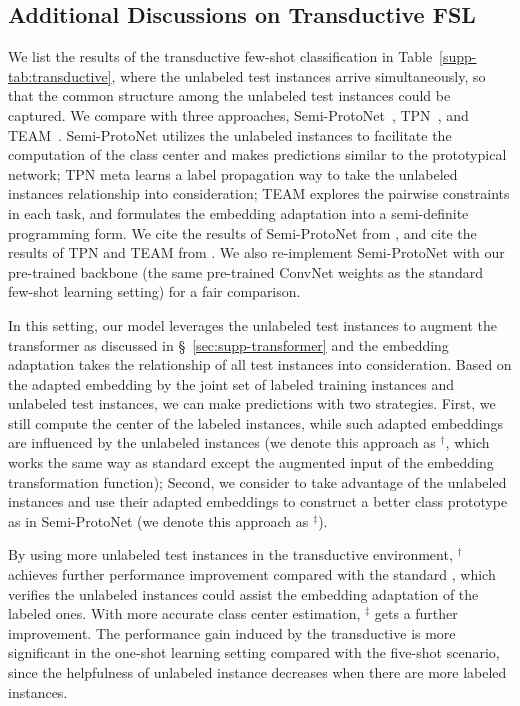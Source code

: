 \subsection{Additional Discussions on Transductive FSL}
\label{sec:supp-extended}
We list the results of the transductive few-shot classification in Table~\ref{supp-tab:transductive}, where the unlabeled test instances arrive simultaneously, so that the common structure among the unlabeled test instances could be captured.
We compare with three approaches, Semi-ProtoNet~\cite{Ren2018Meta}, TPN~\cite{Liu2018TPN}, and TEAM~\cite{Qiao2019Transductive}. Semi-ProtoNet utilizes the unlabeled instances to facilitate the computation of the class center and makes predictions similar to the prototypical network; TPN meta learns a label propagation way to take the unlabeled instances relationship into consideration; TEAM explores the pairwise constraints in each task, and formulates the embedding adaptation into a semi-definite programming form. We cite the results of Semi-ProtoNet from \cite{Ren2018Meta}, and cite the results of TPN and TEAM from \cite{Qiao2019Transductive}. We also re-implement  Semi-ProtoNet with our pre-trained backbone (the same pre-trained ConvNet weights as the standard few-shot learning setting) for a fair comparison.

In this setting, our model leverages the unlabeled test instances to augment the transformer as discussed in \S~\ref{sec:supp-transformer} and the embedding adaptation takes the relationship of all test instances into consideration. Based on the adapted embedding by the joint set of labeled training instances and unlabeled test instances, we can make predictions with two strategies. First, we still compute the center of the labeled instances, while such adapted embeddings are influenced by the unlabeled instances (we denote this approach as {\feat}$^\dagger$, which works the same way as standard {\feat} except the augmented input of the embedding transformation function); Second, we consider to take advantage of the unlabeled instances and use their adapted embeddings to construct a better class prototype as in Semi-ProtoNet (we denote this approach as {\feat}$^\ddagger$).

By using more unlabeled test instances in the transductive environment, {\feat}$^\dagger$ achieves further performance improvement compared with the standard {\feat}, which verifies the unlabeled instances could assist the embedding adaptation of the labeled ones. With more accurate class center estimation, {\feat}$^\ddagger$ gets a further improvement. The performance gain induced by the transductive \feat is more significant in the one-shot learning setting compared with the five-shot scenario, since the helpfulness of unlabeled instance decreases when there are more labeled instances.


